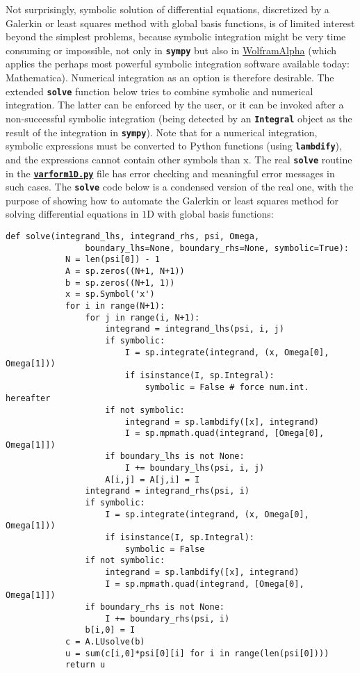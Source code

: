 \documentclass[../main.tex]{subfiles}
\begin{document}
		Not surprisingly, symbolic solution of differential equations, discretized by a Galerkin or least squares method with global basis functions, is of limited interest beyond the simplest problems, because symbolic integration might be very time consuming or impossible, not only in \textbf{\texttt{sympy}} but also in \href{https://www.wolframalpha.com/}{WolframAlpha} (which applies the perhaps most powerful symbolic integration software available today: Mathematica). Numerical integration as an option is therefore desirable.\smallbreak
		The extended \textbf{\texttt{solve}} function below tries to combine symbolic and numerical integration. The latter can be enforced by the user, or it can be invoked after a non-successful symbolic integration (being detected by an \textbf{\texttt{Integral}} object as the result of the integration in \textbf{\texttt{sympy}}). Note that for a numerical integration, symbolic expressions must be converted to Python functions (using \textbf{\texttt{lambdify}}), and the expressions cannot contain other symbols than $\mathrm{x}$. The real \textbf{\texttt{solve}} routine in the \textbf{\texttt{\href{https://github.com/hplgit/INF5620/blob/master/src/fem/varform1D.py}{varform1D.py}}} file has error checking and meaningful error messages in such cases. The \textbf{\texttt{solve}} code below is a condensed version of the real one, with the purpose of showing how to automate the Galerkin or least squares method for solving differential equations in $1 \mathrm{D}$ with global basis functions:
		\begin{lstlisting}[numbers=none]
			def solve(integrand_lhs, integrand_rhs, psi, Omega,
				boundary_lhs=None, boundary_rhs=None, symbolic=True):
			N = len(psi[0]) - 1
			A = sp.zeros((N+1, N+1))
			b = sp.zeros((N+1, 1))
			x = sp.Symbol('x')
			for i in range(N+1):
				for j in range(i, N+1):
					integrand = integrand_lhs(psi, i, j)
					if symbolic:
						I = sp.integrate(integrand, (x, Omega[0], Omega[1]))
						if isinstance(I, sp.Integral):
							symbolic = False # force num.int. hereafter
					if not symbolic:
						integrand = sp.lambdify([x], integrand)
						I = sp.mpmath.quad(integrand, [Omega[0], Omega[1]])
					if boundary_lhs is not None:
						I += boundary_lhs(psi, i, j)
					A[i,j] = A[j,i] = I
				integrand = integrand_rhs(psi, i)
				if symbolic:
					I = sp.integrate(integrand, (x, Omega[0], Omega[1]))
					if isinstance(I, sp.Integral):
						symbolic = False
				if not symbolic:
					integrand = sp.lambdify([x], integrand)
					I = sp.mpmath.quad(integrand, [Omega[0], Omega[1]])
				if boundary_rhs is not None:
					I += boundary_rhs(psi, i)
				b[i,0] = I
			c = A.LUsolve(b)
			u = sum(c[i,0]*psi[0][i] for i in range(len(psi[0])))
			return u
		\end{lstlisting}
\end{document}
